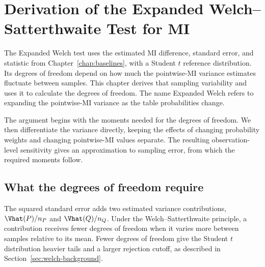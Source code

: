 \chapter{Derivation of the Expanded Welch--Satterthwaite Test for MI}
\label{chap:expanded}

The Expanded Welch test uses the estimated MI difference, standard error,
and statistic from Chapter~\ref{chap:baselines}, with a Student \(t\)
reference distribution. Its degrees of freedom depend on how much the
pointwise-MI variance estimates fluctuate between samples. This chapter
derives that sampling variability and uses it to calculate the degrees of
freedom. The name Expanded Welch refers to expanding the pointwise-MI
variance as the table probabilities change.

The argument begins with the moments needed for the degrees of freedom.
We then differentiate the variance directly, keeping the effects of
changing probability weights and changing pointwise-MI values separate.
The resulting observation-level sensitivity gives an approximation to
sampling error, from which the required moments follow.

\section{What the degrees of freedom require}
\label{sec:component-df-choice}

The squared standard error adds two estimated variance contributions,
\(\Vhat(P)/n_P\) and \(\Vhat(Q)/n_Q\). Under the
Welch--Satterthwaite principle, a contribution receives fewer degrees of
freedom when it varies more between samples relative to its mean. Fewer
degrees of freedom give the Student \(t\) distribution heavier tails
and a larger rejection cutoff, as described in
Section~\ref{sec:welch-background}.

